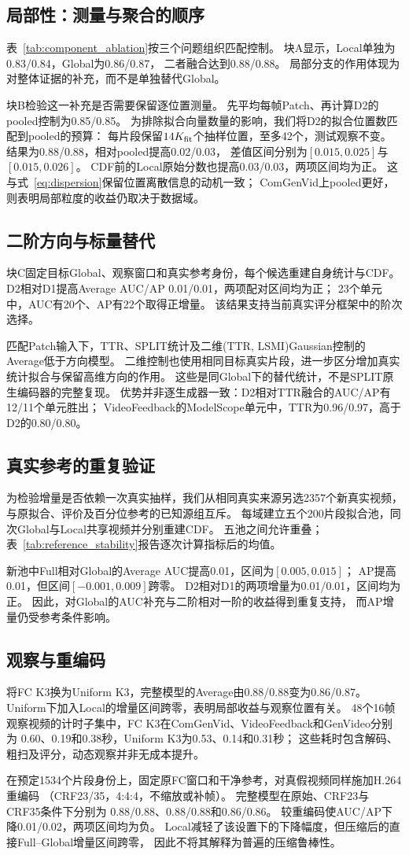 \subsection{局部性：测量与聚合的顺序}
表~\ref{tab:component_ablation}按三个问题组织匹配控制。
块A显示，Local单独为0.83/0.84，Global为0.86/0.87，
二者融合达到0.88/0.88。
局部分支的作用体现为对整体证据的补充，而不是单独替代Global。

块B检验这一补充是否需要保留逐位置测量。
先平均每帧Patch、再计算D2的pooled控制为0.85/0.85。
为排除拟合向量数量的影响，我们将D2的拟合位置数匹配到pooled的预算：
每片段保留$14K_{\rm fit}$个抽样位置，至多42个，测试观察不变。
结果为0.88/0.88，相对pooled提高0.02/0.03，
差值区间分别为$[0.015,0.025]$与$[0.015,0.026]$。
CDF前的Local原始分数也提高0.03/0.03，两项区间均为正。
这与式~\eqref{eq:dispersion}保留位置离散信息的动机一致；
ComGenVid上pooled更好，则表明局部粒度的收益仍取决于数据域。

\subsection{二阶方向与标量替代}
块C固定目标Global、观察窗口和真实参考身份，每个候选重建自身统计与CDF。
D2相对D1提高Average AUC/AP 0.01/0.01，两项配对区间均为正；
23个单元中，AUC有20个、AP有22个取得正增量。
该结果支持当前真实评分框架中的阶次选择。

匹配Patch输入下，TTR、SPLIT统计及二维(TTR, LSMI)Gaussian控制的Average低于方向模型。
二维控制也使用相同目标真实片段，进一步区分增加真实统计拟合与保留高维方向的作用。
这些是同Global下的替代统计，不是SPLIT原生编码器的完整复现。
优势并非逐生成器一致：D2相对TTR融合的AUC/AP有12/11个单元胜出；
VideoFeedback的ModelScope单元中，TTR为0.96/0.97，高于D2的0.80/0.80。

\subsection{真实参考的重复验证}
为检验增量是否依赖一次真实抽样，我们从相同真实来源另选2357个新真实视频，
与原拟合、评价及百分位参考的已知源组互斥。
每域建立五个200片段拟合池，同次Global与Local共享视频并分别重建CDF。
五池之间允许重叠；表~\ref{tab:reference_stability}报告逐次计算指标后的均值。

新池中Full相对Global的Average AUC提高0.01，区间为$[0.005,0.015]$；
AP提高0.01，但区间$[-0.001,0.009]$跨零。
D2相对D1的两项增量为0.01/0.01，区间均为正。
因此，对Global的AUC补充与二阶相对一阶的收益得到重复支持，
而AP增量仍受参考条件影响。

\subsection{观察与重编码}
将FC K3换为Uniform K3，完整模型的Average由0.88/0.88变为0.86/0.87。
Uniform下加入Local的增量区间跨零，表明局部收益与观察位置有关。
48个16帧观察视频的计时子集中，FC K3在ComGenVid、VideoFeedback和GenVideo分别为
0.60、0.19和0.38秒，Uniform K3为0.53、0.14和0.31秒；
这些耗时包含解码、粗扫及评分，动态观察并非无成本提升。

在预定1534个片段身份上，固定原FC窗口和干净参考，对真假视频同样施加H.264重编码
（CRF23/35，4:4:4，不缩放或补帧）。
完整模型在原始、CRF23与CRF35条件下分别为
0.88/0.88、0.88/0.88和0.86/0.86。
较重编码使AUC/AP下降0.01/0.02，两项区间均为负。
Local减轻了该设置下的下降幅度，但压缩后的直接Full--Global增量区间跨零，
因此不将其解释为普遍的压缩鲁棒性。
